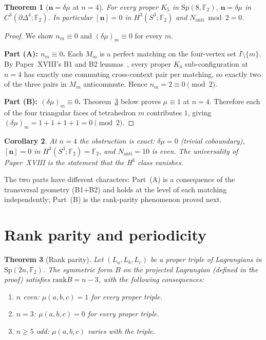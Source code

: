 \documentclass[11pt,a4paper]{article}
\newtheorem{theorem}{Theorem}[section]
\newtheorem{corollary}[theorem]{Corollary}
\theoremstyle{remark}
\newcommand{\F}{\mathbb{F}}
\newcommand{\Sp}{\mathrm{Sp}}
\newcommand{\rank}{\mathrm{rank}}
\newcommand{\Nanti}{N_{\mathrm{anti}}}
\begin{document}
\begin{theorem}[$\mathbf{n}=\delta\mu$ at $n=4$]\label{thm:n4cocycle}
For every proper $K_5$ in $\Sp(8,\F_2)$, $\mathbf{n}=\delta\mu$ in
$C^3(\partial\Delta^4;\F_2)$.  In particular $[\mathbf{n}]=0$ in $H^3(S^3;\F_2)$
and $\Nanti\bmod2=0$.
\end{theorem}

\begin{proof}
We show $n_m\equiv0$ and $(\delta\mu)_m\equiv0$ for every $m$.

\medskip
\noindent\textbf{Part (A): $n_m\equiv0$.}
Each $M_m$ is a perfect matching on the four-vertex set $I\setminus\{m\}$.
By Paper~XVIII's B1 and B2 lemmas~\cite{PaperXVIII}, every proper $K_4$
sub-configuration at $n=4$ has exactly one commuting cross-context pair per
matching, so exactly two of the three pairs in $M_m$ anticommute.
Hence $n_m=2\equiv0\pmod2$.

\medskip
\noindent\textbf{Part (B): $(\delta\mu)_m\equiv0$.}
Theorem~\ref{thm:rankparity} below proves $\mu\equiv1$ at $n=4$.
Therefore each of the four triangular faces of tetrahedron $m$ contributes $1$,
giving $(\delta\mu)_m=1+1+1+1=0\pmod2$.
\end{proof}

\begin{corollary}
At $n=4$ the obstruction is \emph{exact}: $\delta\mu=0$ (trivial coboundary),
$[\mathbf{n}]=0$ in $H^3(S^3;\F_2)=\F_2$, and $\Nanti=10$ is even.
The universality of Paper~XVIII is the statement that the H$^3$ class vanishes.
\end{corollary}

The two parts have different characters: Part~(A) is a consequence of the
transversal geometry (B1+B2) and holds at the level of each matching
independently; Part~(B) is the rank-parity phenomenon proved next.

\section{Rank parity and periodicity}\label{sec:rankparity}

\begin{theorem}[Rank parity]\label{thm:rankparity}
Let $(L_a,L_b,L_c)$ be a proper triple of Lagrangians in $\Sp(2n,\F_2)$.
The symmetric form $B$ on the projected Lagrangian (defined in the proof)
satisfies $\rank B=n-3$, with the following consequences:
\begin{enumerate}
\item[(i)] $n$ \emph{even}: $\mu(a,b,c)=1$ for every proper triple.
\item[(ii)] $n=3$: $\mu(a,b,c)=0$ for every proper triple.
\item[(iii)] $n\ge5$ \emph{odd}: $\mu(a,b,c)$ varies with the triple.
\end{enumerate}
\end{theorem}
\end{document}
